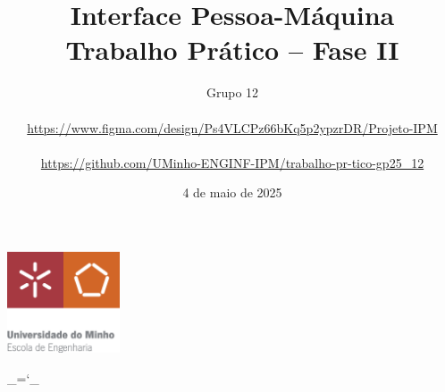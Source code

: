 \documentclass[12pt, a4paper]{article}
\title{\textbf{Interface Pessoa-Máquina \\ \large Trabalho Prático -- Fase II}}
\date{4 de maio de 2025}
\author{Grupo 12 \\ \\
    \url{https://www.figma.com/design/Ps4VLCPz66bKq5p2ypzrDR/Projeto-IPM} \\ \\
    \url{https://github.com/UMinho-ENGINF-IPM/trabalho-pr-tico-gp25_12}}
\begin{document}
\begin{center}
    \includegraphics[width=0.25\textwidth]{res/cover/school-of-engineering.eps}
\end{center}

{\let\newpage\relax\maketitle}
\maketitle
\thispagestyle{empty}

\chardef\_=`_
\onehalfspacing
\setlength{\parskip}{\baselineskip}
\setlength{\intextsep}{2\baselineskip}
\setlength\belowcaptionskip{-\baselineskip}
\setlength{\parindent}{0pt}
\def\arraystretch{1.5}
\end{document}
